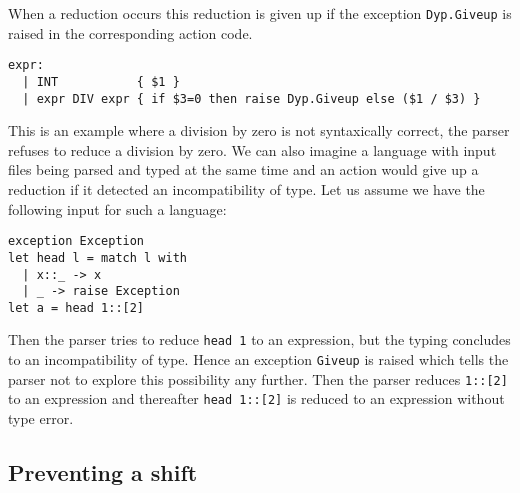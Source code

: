 \documentclass[12pt]{article}
\begin{document}
{When a reduction occurs this reduction is given up if the exception \texttt{Dyp.Giveup} is raised in the corresponding action code.
\begin{verbatim}
expr:
  | INT           { $1 }
  | expr DIV expr { if $3=0 then raise Dyp.Giveup else ($1 / $3) }
\end{verbatim}
This is an example where a division by zero is not syntaxically correct, the parser refuses to reduce a division by zero. We can also imagine a language with input files being parsed and typed at the same time and an action would give up a reduction if it detected an incompatibility of type. Let us assume we have the following input for such a language:
\begin{verbatim}
exception Exception
let head l = match l with
  | x::_ -> x
  | _ -> raise Exception
let a = head 1::[2]
\end{verbatim}
Then the parser tries to reduce \texttt{head 1} to an expression, but the typing concludes to an incompatibility of type. Hence an exception \texttt{Giveup} is raised which tells the parser not to explore this possibility any further. Then the parser reduces \texttt{1::[2]} to an expression and thereafter \texttt{head 1::[2]} is reduced to an expression without type error.

\subsection{Preventing a shift}\label{will_shift}

}
\end{document}
